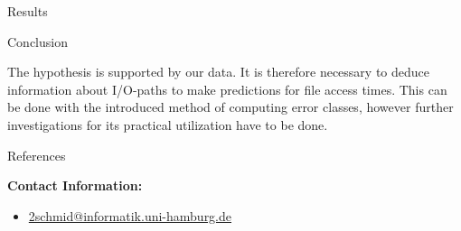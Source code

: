 \documentclass[final]{beamer}
\newlength{\onecolwid}
\begin{document}
\begin{frame}[t]
\begin{columns}[t]
\begin{column}{\onecolwid}
\begin{block}{Results}
\end{block}


\vspace*{-2cm}
\begin{block}{Conclusion}

	The hypothesis is supported by our data.
	It is therefore necessary to deduce information about I/O-paths to make predictions for file access times.
	This can be done with the introduced method of computing error classes, however further investigations for its practical utilization have to be done. 

\end{block}



\begin{block}{References}

\nocite{*} %
\tiny{
\vspace{0.75in}}

\end{block}

	\footnotesize
	
	\vspace*{-2cm}
	\begin{exampleblock}{}
		\vspace*{-1.2cm}
		\textbf{Contact Information:}
		\vspace*{-0.4cm}
		\begin{itemize}
			\item \href{mailto:2schmid@informatik.uni-hamburg.de}{2schmid@informatik.uni-hamburg.de}
		\end{itemize}
		

\end{exampleblock}
\end{column}
\end{columns}
\end{frame}
\end{document}
